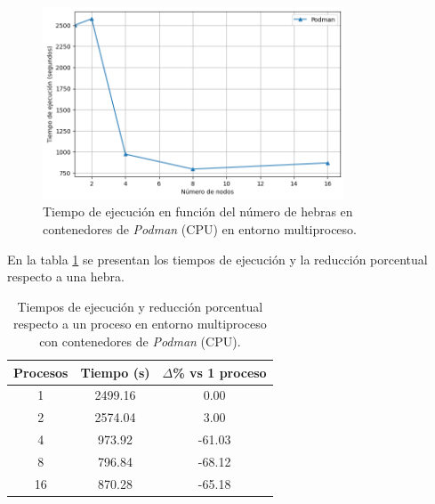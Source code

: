 \begin{figure}[ht]
    \centering
    \includegraphics[width=0.8\textwidth]{imagenes/cap5/multi-node_ubuntu_podman_time.png}
    \caption{Tiempo de ejecución en función del número de hebras en contenedores de \textit{Podman} (CPU) en entorno multiproceso.}
    \label{fig:multi-node_ubuntu_podman}
\end{figure}

En la tabla \ref{tab:multi-node_ubuntu_podman} se presentan los tiempos de ejecución y la reducción porcentual respecto a una hebra.

\begin{table}[ht]
    \centering
    \begin{tabular}{|c|c|c|}
        \hline
        \textbf{Procesos} & \textbf{Tiempo (s)} & \textbf{$\Delta$\% vs 1 proceso} \\
        \hline
        1                 & 2499.16             & 0.00                             \\
        2                 & 2574.04             & 3.00                             \\
        4                 & 973.92              & -61.03                           \\
        8                 & 796.84              & -68.12                           \\
        16                & 870.28              & -65.18                           \\
        \hline
    \end{tabular}
    \caption{Tiempos de ejecución y reducción porcentual respecto a un proceso en entorno multiproceso con contenedores de \textit{Podman} (CPU).}
    \label{tab:multi-node_ubuntu_podman}
\end{table}

